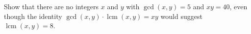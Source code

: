 Show that there are no integers $x$ and $y$ with $\gcd(x,y)=5$ and $xy=40$, even though the identity $\gcd(x,y)\cdot\operatorname{lcm}(x,y)=xy$ would suggest $\operatorname{lcm}(x,y)=8$.
